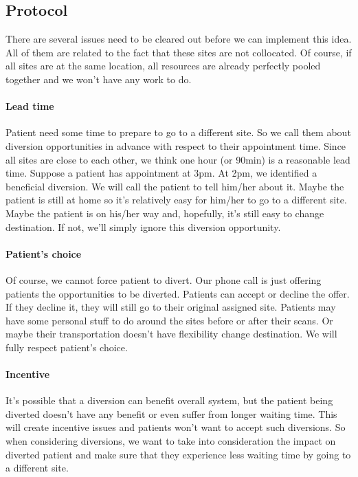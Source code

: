 \subsection{Protocol}

There are several issues need to be cleared out before we can implement this idea. All of them are related to the fact that these sites are not collocated. Of course, if all sites are at the same location, all resources are already perfectly pooled together and we won't have any work to do.

\paragraph{Lead time} Patient need some time to prepare to go to a different site.  So we call them about diversion opportunities in advance with respect to their appointment time. Since all sites are close to each other, we think one hour (or 90min) is a reasonable lead time. Suppose a patient has appointment at 3pm. At 2pm, we identified a beneficial diversion. We will call the patient to tell him/her about it. Maybe the patient is still at home so it's relatively easy for him/her to go to a different site. Maybe the patient is on his/her way and, hopefully, it's still easy to change destination. If not, we'll simply ignore this diversion opportunity.

\paragraph{Patient's choice} Of course, we cannot force patient to divert. Our phone call is just offering patients the opportunities to be diverted. Patients can accept or decline the offer. If they decline it, they will still go to their original assigned site. Patients may have some personal stuff to do around the sites before or after their scans. Or maybe their transportation doesn't have flexibility change destination. We will fully respect patient's choice.

\paragraph{Incentive} It's possible that a diversion can benefit overall system, but the patient being diverted doesn't have any benefit or even suffer from longer waiting time. This will create incentive issues and patients won't want to accept such diversions. So when considering diversions, we want to take into consideration the impact on diverted patient and make sure that they experience less waiting time by going to a different site.

